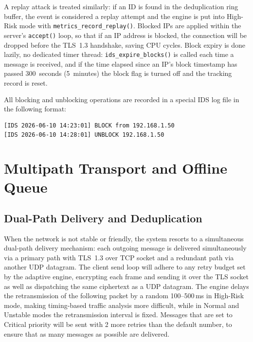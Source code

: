 \documentclass[conference]{IEEEtran}
\begin{document}
A replay attack is treated similarly: if an ID is found in the deduplication ring buffer, the event is considered a replay attempt and the engine is put into High-Risk mode with \texttt{metrics\_record\_replay()}. Blocked IPs are applied within the server's \texttt{accept()} loop, so that if an IP address is blocked, the connection will be dropped before the TLS~1.3 handshake, saving CPU cycles. Block expiry is done lazily, no dedicated timer thread: \texttt{ids\_expire\_blocks()} is called each time a message is received, and if the time elapsed since an IP's block timestamp has passed 300~seconds (5~minutes) the block flag is turned off and the tracking record is reset.

All blocking and unblocking operations are recorded in a special IDS log file in the following format:
{\footnotesize
\begin{verbatim}
[IDS 2026-06-10 14:23:01] BLOCK from 192.168.1.50
[IDS 2026-06-10 14:28:01] UNBLOCK 192.168.1.50
\end{verbatim}
}

\section{Multipath Transport and Offline Queue}
\label{sec:multipath_transport}

\subsection{Dual-Path Delivery and Deduplication}

When the network is not stable or friendly, the system resorts to a simultaneous dual-path delivery mechanism: each outgoing message is delivered simultaneously via a primary path with TLS~1.3 over TCP socket and a redundant path via another UDP datagram. The client send loop will adhere to any retry budget set by the adaptive engine, encrypting each frame and sending it over the TLS socket as well as dispatching the same ciphertext as a UDP datagram. The engine delays the retransmission of the following packet by a random 100--500\,ms in High-Risk mode, making timing-based traffic analysis more difficult, while in Normal and Unstable modes the retransmission interval is fixed. Messages that are set to Critical priority will be sent with 2 more retries than the default number, to ensure that as many messages as possible are delivered.
\end{document}
